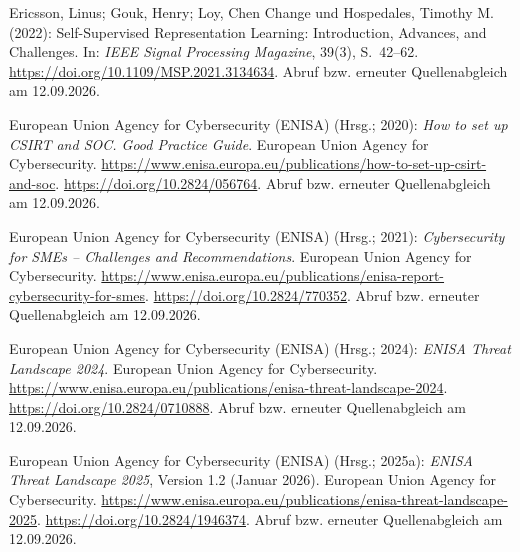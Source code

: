 \begin{samepage}
\noindent
Ericsson, Linus; Gouk, Henry; Loy, Chen Change und Hospedales, Timothy M. (2022):
Self-Supervised Representation Learning: Introduction, Advances, and Challenges.
In: \textit{IEEE Signal Processing Magazine}, 39(3), S.~42--62.
\url{https://doi.org/10.1109/MSP.2021.3134634}.
Abruf bzw. erneuter Quellenabgleich am 12.09.2026.
\par\end{samepage}
\par\smallskip
\begin{samepage}
\noindent
European Union Agency for Cybersecurity (ENISA) (Hrsg.; 2020):
\textit{How to set up CSIRT and SOC. Good Practice Guide}.
European Union Agency for Cybersecurity.
\url{https://www.enisa.europa.eu/publications/how-to-set-up-csirt-and-soc}.
\url{https://doi.org/10.2824/056764}.
Abruf bzw. erneuter Quellenabgleich am 12.09.2026.
\par\end{samepage}
\par\smallskip
\begin{samepage}
\noindent
European Union Agency for Cybersecurity (ENISA) (Hrsg.; 2021):
\textit{Cybersecurity for SMEs -- Challenges and Recommendations}.
European Union Agency for Cybersecurity.
\url{https://www.enisa.europa.eu/publications/enisa-report-cybersecurity-for-smes}.
\url{https://doi.org/10.2824/770352}.
Abruf bzw. erneuter Quellenabgleich am 12.09.2026.
\par\end{samepage}
\par\smallskip
\begin{samepage}
\noindent
European Union Agency for Cybersecurity (ENISA) (Hrsg.; 2024):
\textit{ENISA Threat Landscape 2024}.
European Union Agency for Cybersecurity.
\url{https://www.enisa.europa.eu/publications/enisa-threat-landscape-2024}.
\url{https://doi.org/10.2824/0710888}.
Abruf bzw. erneuter Quellenabgleich am 12.09.2026.
\par\end{samepage}
\par\smallskip
\begin{samepage}
\noindent
European Union Agency for Cybersecurity (ENISA) (Hrsg.; 2025a):
\textit{ENISA Threat Landscape 2025}, Version 1.2 (Januar 2026).
European Union Agency for Cybersecurity.
\url{https://www.enisa.europa.eu/publications/enisa-threat-landscape-2025}.
\url{https://doi.org/10.2824/1946374}.
Abruf bzw. erneuter Quellenabgleich am 12.09.2026.
\par\end{samepage}
